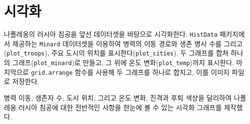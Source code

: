 \documentclass[
  letterpaper,
  chapter,a4paper,showtrims,openright,hidelinks]{oblivoir}
\begin{document}
\hypertarget{uxc2dcuxac01uxd654-1}{%
\section{시각화}\label{uxc2dcuxac01uxd654-1}}

나폴레옹의 러시아 침공을 앞선 데이터셋을 바탕으로 시각화한다.
\texttt{HistData} 패키지에서 제공하는 \texttt{Minard} 데이터셋을
이용하여 병력의 이동 경로와 생존 병사 수를
그리고(\texttt{plot\_troops}), 주요 도시의 위치를
표시한다(\texttt{plot\_cities}). 두 그래프를 합쳐 하나의
그래프(\texttt{plot\_minard})로 만들고, 그 위에 온도
변화(\texttt{plot\_temp})까지 표시한다. 마지막으로 \texttt{grid.arrange}
함수를 사용해 두 그래프를 하나로 합치고, 이를 이미지 파일로 저장한다.

병력 이동, 생존자 수, 도시 위치, 그리고 온도 변화, 진격과 후퇴 색상을
달리하여 나폴레옹 러시아 침공에 대한 전반적인 사항을 한눈에 볼 수 있는
시각화 그래프를 제작했다.
\end{document}
